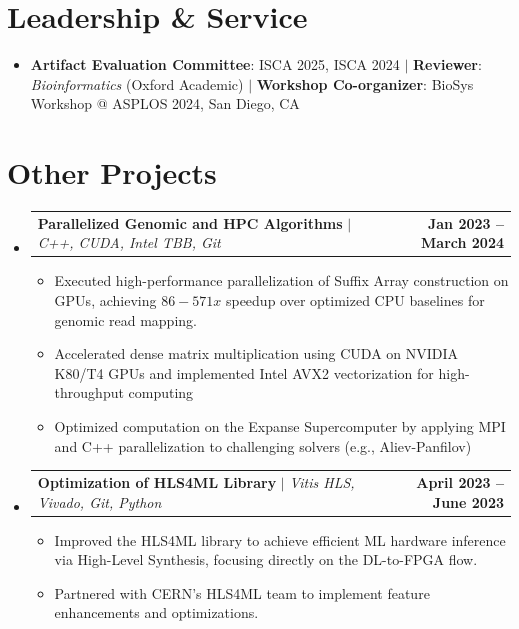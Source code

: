 \documentclass[letterpaper,11pt]{article}
\makeatletter
\newcommand{\resumeItem}[1]{
  \item{
    {#1 \vspace{-2pt}}
  }
}
\newcommand{\resumeProjectHeading}[2]{
    \item
    \begin{tabular*}{1.001\textwidth}{l@{\extracolsep{\fill}}r}
      #1 & \textbf{#2}\\
    \end{tabular*}\vspace{-7pt}
}
\newcommand{\resumeSubHeadingListStart}{\begin{itemize}[leftmargin=0.0in, label={}]}
\newcommand{\resumeSubHeadingListEnd}{\end{itemize}}
\newcommand{\resumeItemListStart}{\begin{itemize}}
\newcommand{\resumeItemListEnd}{\end{itemize}\vspace{-5pt}}
\makeatother
\begin{document}
\section{Leadership \& Service}
 \resumeItemListStart
    \resumeItem{\textbf{Artifact Evaluation Committee}: ISCA 2025, ISCA 2024 \quad $|$ \quad \textbf{Reviewer}: \emph{Bioinformatics} (Oxford Academic) \quad $|$ \quad \textbf{Workshop Co-organizer}: BioSys Workshop @ ASPLOS 2024, San Diego, CA}
 \resumeItemListEnd

\section{Other Projects}
    \vspace{-5pt}
    \resumeSubHeadingListStart
        \resumeProjectHeading
          {\textbf{Parallelized Genomic and HPC Algorithms} $|$ \emph{C++, CUDA, Intel TBB, Git}}{Jan 2023 -- March 2024}
          \resumeItemListStart
            \resumeItem{Executed high-performance parallelization of Suffix Array construction on GPUs, achieving $86-571x$ speedup over optimized CPU baselines for genomic read mapping.}
            \resumeItem{Accelerated dense matrix multiplication using CUDA on NVIDIA K80/T4 GPUs and implemented Intel AVX2 vectorization for high-throughput computing}
            \resumeItem{Optimized computation on the Expanse Supercomputer by applying MPI and C++ parallelization to challenging solvers (e.g., Aliev-Panfilov)}
          \resumeItemListEnd
             \vspace{-13pt}
        \resumeProjectHeading
              {\textbf{Optimization of HLS4ML Library} $|$ \emph{Vitis HLS, Vivado, Git, Python}}{April 2023 -- June 2023}
          \resumeItemListStart
            \resumeItem{Improved the HLS4ML library to achieve efficient ML hardware inference via High-Level Synthesis, focusing directly on the DL-to-FPGA flow.}
            \resumeItem{Partnered with CERN's HLS4ML team to implement feature enhancements and optimizations.}
            \resumeItemListEnd
    \resumeSubHeadingListEnd

\end{document}

